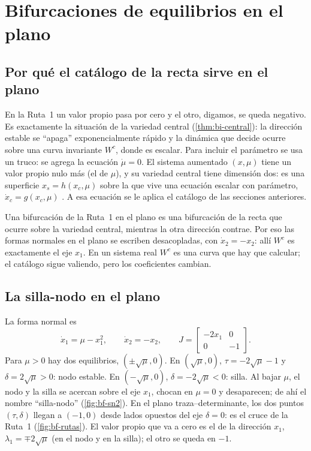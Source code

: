 \section{Bifurcaciones de equilibrios en el plano}
\label{sec:bf-plano}

\subsection{Por qué el catálogo de la recta sirve en el plano}

En la Ruta~1 un valor propio pasa por cero y el otro, digamos, se queda negativo. Es exactamente la situación de la variedad central (\cref{thm:bi-central}): la dirección estable se ``apaga'' exponencialmente rápido y la dinámica que decide ocurre sobre una curva invariante $W^c$, donde es escalar. Para incluir el parámetro se usa un truco: se agrega la ecuación $\dot\mu=0$. El sistema aumentado $(x,\mu)$ tiene un valor propio nulo más (el de $\mu$), y su variedad central tiene dimensión dos: es una superficie $x_s=h(x_c,\mu)$ sobre la que vive una ecuación escalar con parámetro, $\dot x_c=g(x_c,\mu)$ \citep[\S3.2]{GuHo83}. A esa ecuación se le aplica el catálogo de las secciones anteriores.

\begin{ideaclave}
Una bifurcación de la Ruta~1 en el plano es una bifurcación de la recta que ocurre sobre la variedad central, mientras la otra dirección contrae. Por eso las formas normales en el plano se escriben desacopladas, con $\dot x_2=-x_2$: allí $W^c$ es exactamente el eje $x_1$. En un sistema real $W^c$ es una curva que hay que calcular; el catálogo sigue valiendo, pero los coeficientes cambian.
\end{ideaclave}

\subsection{La silla-nodo en el plano}

La forma normal es
\begin{equation}
  \dot x_1=\mu-x_1^2,\qquad \dot x_2=-x_2 ,\qquad J=\begin{bmatrix}-2x_1&0\\0&-1\end{bmatrix} .
  \label{eq:bf-sn2}
\end{equation}
Para $\mu>0$ hay dos equilibrios, $(\pm\sqrt\mu,0)$. En $(\sqrt\mu,0)$, $\tau=-2\sqrt\mu-1$ y $\delta=2\sqrt\mu>0$: nodo estable. En $(-\sqrt\mu,0)$, $\delta=-2\sqrt\mu<0$: silla. Al bajar $\mu$, el nodo y la silla se acercan sobre el eje $x_1$, chocan en $\mu=0$ y desaparecen; de ahí el nombre ``silla-nodo'' (\cref{fig:bf-sn2}). En el plano traza--determinante, los dos puntos $(\tau,\delta)$ llegan a $(-1,0)$ desde lados opuestos del eje $\delta=0$: es el cruce de la Ruta~1 (\cref{fig:bf-rutas}). El valor propio que va a cero es el de la dirección $x_1$, $\lambda_1=\mp2\sqrt\mu$ (en el nodo y en la silla); el otro se queda en $-1$.

